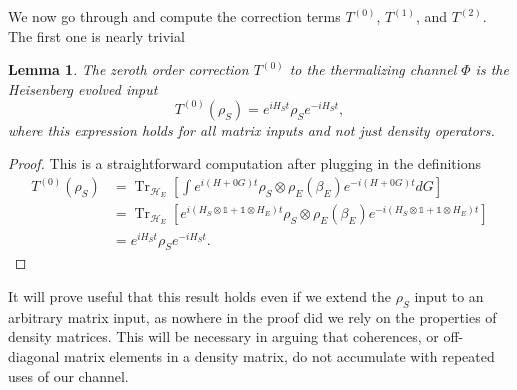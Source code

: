 \documentclass{article}
\newtheorem{lemma}[theorem]{Lemma}
\newcommand{\brackets}[1]{\left[ #1 \right]}
\DeclareMathOperator{\Tr}{Tr}
\newcommand{\partrace}[2]{\Tr_{#1} \brackets{ #2 }}
\newcommand{\hilb}{\mathcal{H}}
\newcommand{\identity}{\mathds{1}}
\begin{document}
We now go through and compute the correction terms $T^{(0)}$, $T^{(1)}$, and $T^{(2)}$. The first one is nearly trivial
\begin{lemma}
    The zeroth order correction $T^{(0)}$ to the thermalizing channel $\Phi$ is the Heisenberg evolved input 
    \begin{equation}
        T^{(0)}(\rho_S) = e^{i H_S t} \rho_S e^{-i H_S t},
    \end{equation}
    where this expression holds for all matrix inputs and not just density operators.
\end{lemma}
\begin{proof}
This is a straightforward computation after plugging in the definitions
    \begin{align}
        T^{(0)}(\rho_S) &= \partrace{\hilb_E}{\int e^{i(H + 0 G)t} \rho_S \otimes \rho_E(\beta_E) e^{-i(H + 0 G)t} dG } \\
        &= \partrace{\hilb_E}{e^{i (H_S \otimes \identity + \identity \otimes H_E)t} \rho_S \otimes \rho_E(\beta_E) e^{-i (H_S \otimes \identity + \identity \otimes H_E)t}} \\
        &= e^{i H_S t} \rho_S e^{-i H_S t}.
    \end{align}
\end{proof}
It will prove useful that this result holds even if we extend the $\rho_S$ input to an arbitrary matrix input, as nowhere in the proof did we rely on the properties of density matrices. This will be necessary in arguing that coherences, or off-diagonal matrix elements in a density matrix, do not accumulate with repeated uses of our channel.
\end{document}
